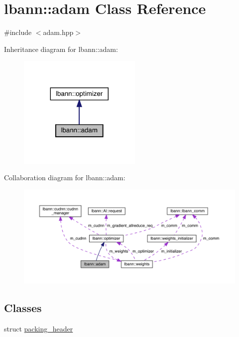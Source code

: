 \hypertarget{classlbann_1_1adam}{}\section{lbann\+:\+:adam Class Reference}
\label{classlbann_1_1adam}


{\ttfamily \#include $<$adam.\+hpp$>$}



Inheritance diagram for lbann\+:\+:adam\+:\nopagebreak
\begin{figure}[H]
\begin{center}
\leavevmode
\includegraphics[width=167pt]{classlbann_1_1adam__inherit__graph}
\end{center}
\end{figure}


Collaboration diagram for lbann\+:\+:adam\+:\nopagebreak
\begin{figure}[H]
\begin{center}
\leavevmode
\includegraphics[width=350pt]{classlbann_1_1adam__coll__graph}
\end{center}
\end{figure}
\subsection*{Classes}
\begin{DoxyCompactItemize}
\item 
struct \hyperlink{structlbann_1_1adam_1_1packing__header}{packing\+\_\+header}
\end{DoxyCompactItemize}
